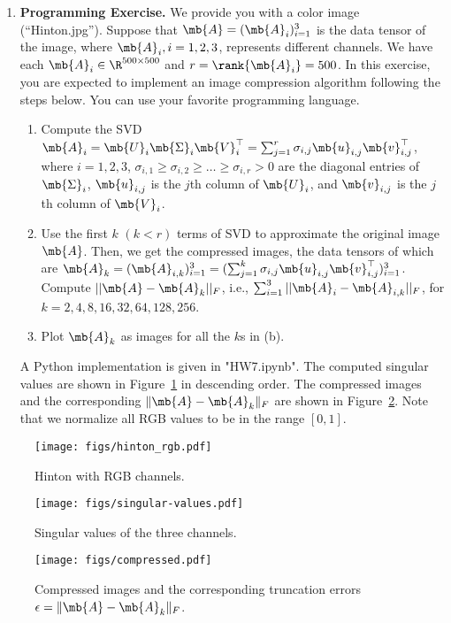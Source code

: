 \begin{exercise}
\begin{enumerate}
        \item \textbf{Programming Exercise.} We provide you with a color image (``Hinton.jpg''). Suppose that $\mb{A}=(\mb{A}_i)_{i=1}^3$ is the data tensor of the image, where $\mb{A}_i,i=1,2,3$, represents different channels.
            We have each $\mb{A}_i\in\R^{500\times 500}$ and $r=\rank{\mb{A}_i}=500$. In this exercise, you are expected to implement an image compression algorithm following the steps below. You can use your favorite programming language.
            \begin{enumerate}
                \item Compute the SVD $\mb{A}_i=\mb{U}_i\mb{\Sigma}_i\mb{ V}_i^\top=\sum_{j=1}^r\sigma_{i,j}\mb{u}_{i,j}\mb{v}_{i,j}^\top$, where $i=1,2,3$, $\sigma_{i,1}\ge \sigma_{i,2}\ge \dots\ge \sigma_{i,r}>0$ are the diagonal entries of $\mb{\Sigma}_i$, $\mb{u}_{i,j}$ is the $j$th column of $\mb{U}_i$, and $\mb{v}_{i,j}$ is the $j$th column of $\mb{V}_i$.
                \item
                    Use the first $k$ $(k< r)$ terms of SVD to approximate the original image $\mb{A}$. Then, we get the compressed images, the data tensors of which are $\mb{A}_{k}=(\mb{A}_{i,k})_{i=1}^3 = (\sum_{j=1}^k\sigma_{i,j}\mb{u}_{i,j} \\ \mb{v}_{i,j}^\top)_{i=1}^3$. Compute $||\mb{A}-\mb{A}_k||_F$, i.e., $\sum_{i=1}^3||\mb{A}_i-\mb{A}_{i,k}||_F$, for $k=2,4,8,16,32,64,128,256$.
                \item Plot $\mb{A}_k$ as images for all the $k$s in (b).
            \end{enumerate}

            \begin{solution}
                A Python implementation is given in "HW7.ipynb". The computed singular values are shown in Figure~\ref{fig:singular-values} in descending order. The compressed images and the corresponding $\|\mb{A}-\mb{A}_k\|_F$ are shown in Figure~\ref{fig:compressed}. Note that we normalize all RGB values to be in the range $[0,1]$.
                \qedhere
            \end{solution}
    \end{enumerate}
\end{exercise}
\newpage
\begin{figure}[H]
    \centering
    \texttt{[image: figs/hinton\_rgb.pdf]}
    \caption{Hinton with RGB channels.}
\end{figure}
\begin{figure}[H]
    \centering
    \texttt{[image: figs/singular-values.pdf]}
    \caption{Singular values of the three channels.}
    \label{fig:singular-values}
\end{figure}
\begin{figure}[H]
    \centering
    \texttt{[image: figs/compressed.pdf]}
    \caption{Compressed images and the corresponding truncation errors $\epsilon=\|\mb{A}-\mb{A}_k\|_F$.}
    \label{fig:compressed}
\end{figure}
\clearpage




